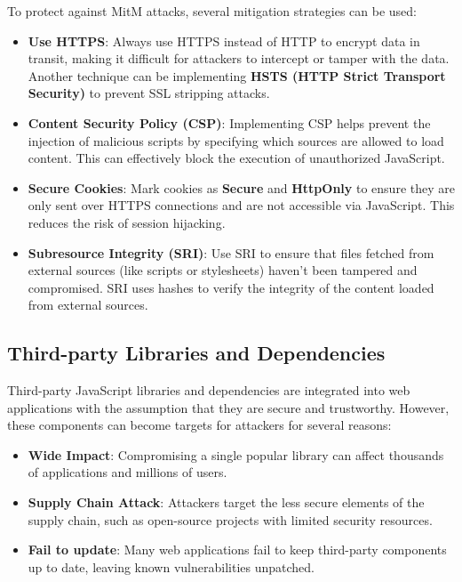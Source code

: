 \documentclass{article}
\begin{document}
To protect against MitM attacks, several mitigation strategies can be used:
\begin{itemize}
	\item \textbf{Use HTTPS}: Always use HTTPS instead of HTTP to encrypt data in transit, making it difficult for attackers to intercept or tamper with the data. Another technique can be implementing \textbf{HSTS (HTTP Strict Transport Security)} to prevent SSL stripping attacks.
	\item \textbf{Content Security Policy (CSP)}: Implementing CSP helps prevent the injection of malicious scripts by specifying which sources are allowed to load content. This can effectively block the execution of unauthorized JavaScript.
	\item \textbf{Secure Cookies}: Mark cookies as \textbf{Secure} and \textbf{HttpOnly} to ensure they are only sent over HTTPS connections and are not accessible via JavaScript. This reduces the risk of session hijacking.
	\item \textbf{Subresource Integrity (SRI)}: Use SRI to ensure that files fetched from external sources (like scripts or stylesheets) haven't been tampered and compromised. SRI uses hashes to verify the integrity of the content loaded from external sources.
\end{itemize}

\subsection{Third-party Libraries and Dependencies}
Third-party JavaScript libraries and dependencies are integrated into web applications with the assumption that they are secure and trustworthy. However, these components can become targets for attackers for several reasons:
\begin{itemize}
	\item \textbf{Wide Impact}: Compromising a single popular library can affect thousands of applications and millions of users.
	\item \textbf{Supply Chain Attack}: Attackers target the less secure elements of the supply chain, such as open-source projects with limited security resources.
	\item \textbf{Fail to update}: Many web applications fail to keep third-party components up to date, leaving known vulnerabilities unpatched.
\end{itemize}
\end{document}
